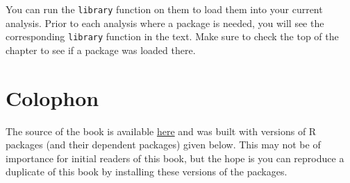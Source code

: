 \documentclass[]{tufte-book}
\newenvironment{Shaded}{\begin{snugshade}}{\end{snugshade}}
\newcommand{\KeywordTok}[1]{\textcolor[rgb]{0.13,0.29,0.53}{\textbf{{#1}}}}
\newcommand{\DataTypeTok}[1]{\textcolor[rgb]{0.13,0.29,0.53}{{#1}}}
\newcommand{\StringTok}[1]{\textcolor[rgb]{0.31,0.60,0.02}{{#1}}}
\newcommand{\NormalTok}[1]{{#1}}
\begin{document}
You can run the \texttt{library} function on them to load them into your
current analysis. Prior to each analysis where a package is needed, you
will see the corresponding \texttt{library} function in the text. Make
sure to check the top of the chapter to see if a package was loaded
there.

\begin{Shaded}
\end{Shaded}

\section*{Colophon}\label{colophon}

The source of the book is available
\href{https://github.com/ismayc/moderndiver-book}{here} and was built
with versions of R packages (and their dependent packages) given below.
This may not be of importance for initial readers of this book, but the
hope is you can reproduce a duplicate of this book by installing these
versions of the packages.
\end{document}
